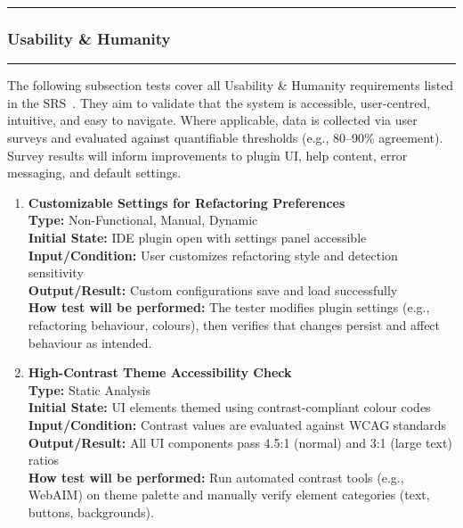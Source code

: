 \documentclass[12pt, titlepage]{article}
\newcommand{\colorrule}{\textcolor{BlueViolet}{\rule{\linewidth}{2pt}}}
\begin{document}
\noindent\colorrule

\subsubsection{Usability \& Humanity}
\colorrule

\medskip

\noindent
The following subsection tests cover all Usability \& Humanity
requirements listed in the SRS~\cite{SRS}. They aim to validate that
the system is accessible, user-centred, intuitive, and easy to navigate. Where applicable, data is collected via user surveys and evaluated against quantifiable thresholds (e.g., 80–90\% agreement). Survey results will inform improvements to plugin UI, help content, error messaging, and default settings.

\begin{enumerate}[label={\bf \textcolor{Maroon}{test-UH-\arabic*}},
    wide=0pt, font=\itshape]
    
  \item \textbf{Customizable Settings for Refactoring Preferences} \\[2mm]
    \textbf{Type:} Non-Functional, Manual, Dynamic \\
    \textbf{Initial State:} IDE plugin open with settings panel accessible \\
    \textbf{Input/Condition:} User customizes refactoring style and detection sensitivity \\
    \textbf{Output/Result:} Custom configurations save and load successfully \\[2mm]
    \textbf{How test will be performed:} The tester modifies plugin settings (e.g., refactoring behaviour, colours), then verifies that changes persist and affect behaviour as intended.

  \item \textbf{High-Contrast Theme Accessibility Check} \\[2mm]
    \textbf{Type:} Static Analysis \\
    \textbf{Initial State:} UI elements themed using contrast-compliant colour codes \\
    \textbf{Input/Condition:} Contrast values are evaluated against WCAG standards \\
    \textbf{Output/Result:} All UI components pass 4.5:1 (normal) and 3:1 (large text) ratios \\[2mm]
    \textbf{How test will be performed:} Run automated contrast tools (e.g., WebAIM) on theme palette and manually verify element categories (text, buttons, backgrounds).


\end{enumerate}
\end{document}
